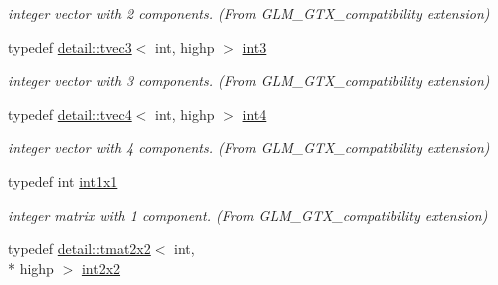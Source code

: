 \begin{DoxyCompactItemize}
\begin{DoxyCompactList}\small\item\em integer vector with 2 components. (From G\-L\-M\-\_\-\-G\-T\-X\-\_\-compatibility extension) \end{DoxyCompactList}\item 
\hypertarget{group__gtx__compatibility_gac305b0da08fad90d91854569679c935e}{typedef \hyperlink{structglm_1_1detail_1_1tvec3}{detail\-::tvec3}$<$ int, highp $>$ \hyperlink{group__gtx__compatibility_gac305b0da08fad90d91854569679c935e}{int3}}\label{group__gtx__compatibility_gac305b0da08fad90d91854569679c935e}

\begin{DoxyCompactList}\small\item\em integer vector with 3 components. (From G\-L\-M\-\_\-\-G\-T\-X\-\_\-compatibility extension) \end{DoxyCompactList}\item 
\hypertarget{group__gtx__compatibility_ga9f621a690aa1c2918a9a8a684376b562}{typedef \hyperlink{structglm_1_1detail_1_1tvec4}{detail\-::tvec4}$<$ int, highp $>$ \hyperlink{group__gtx__compatibility_ga9f621a690aa1c2918a9a8a684376b562}{int4}}\label{group__gtx__compatibility_ga9f621a690aa1c2918a9a8a684376b562}

\begin{DoxyCompactList}\small\item\em integer vector with 4 components. (From G\-L\-M\-\_\-\-G\-T\-X\-\_\-compatibility extension) \end{DoxyCompactList}\item 
\hypertarget{group__gtx__compatibility_ga09016a637a3cd093c22e6188080ac750}{typedef int \hyperlink{group__gtx__compatibility_ga09016a637a3cd093c22e6188080ac750}{int1x1}}\label{group__gtx__compatibility_ga09016a637a3cd093c22e6188080ac750}

\begin{DoxyCompactList}\small\item\em integer matrix with 1 component. (From G\-L\-M\-\_\-\-G\-T\-X\-\_\-compatibility extension) \end{DoxyCompactList}\item 
\hypertarget{group__gtx__compatibility_ga7762d2b809aab75003e7e7873ca74a2f}{typedef \hyperlink{structglm_1_1detail_1_1tmat2x2}{detail\-::tmat2x2}$<$ int, \\*
highp $>$ \hyperlink{group__gtx__compatibility_ga7762d2b809aab75003e7e7873ca74a2f}{int2x2}}\label{group__gtx__compatibility_ga7762d2b809aab75003e7e7873ca74a2f}


\end{DoxyCompactItemize}
